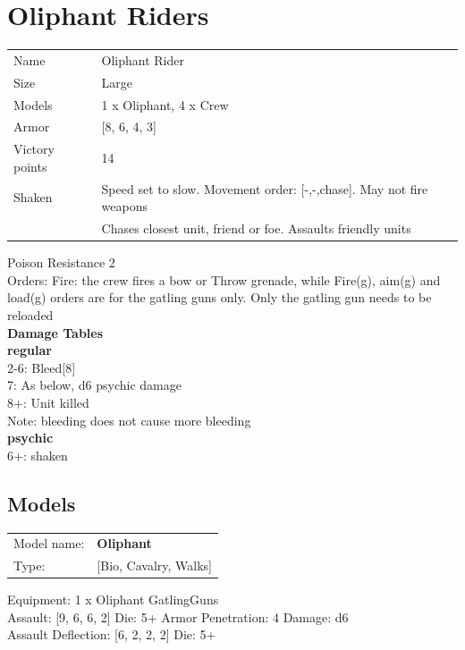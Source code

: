 \clearpage

\section{ Oliphant Riders }

\begin{tabular}{ll}
  Name & Oliphant Rider \\
  Size & Large\\
  Models & 1 x Oliphant, 4 x Crew\\
  Armor & [8, 6, 4, 3]\\
  Victory points & 14\\
  Shaken & Speed set to slow. Movement order: [-,-,chase]. May not fire weapons\\ &Chases closest unit, friend or foe. Assaults friendly units\\
\end{tabular}

Poison Resistance 2\\ 
Orders: Fire: the crew fires a bow or Throw grenade, while Fire(g), aim(g) and load(g) orders are for the gatling guns only. Only the gatling gun needs to be reloaded\\ 



{\bf Damage Tables} \\
 {\bf regular } \\
2-6: Bleed[8]  \\
7: As below, d6 psychic damage \\
8+: Unit killed \\
Note: bleeding does not cause more bleeding \\
 {\bf psychic } \\
6+: shaken \\


\clearpage

\subsection{ Models }

\begin{tabular}{ll}
Model name: & {\bf Oliphant } \\
Type: & [Bio, Cavalry, Walks] \\
\end{tabular}

Equipment: 1 x Oliphant GatlingGuns \\

Assault: [9, 6, 6, 2] Die: 5+ Armor Penetration: 4 Damage: d6 \\
Assault Deflection: [6, 2, 2, 2] Die: 5+\\
\indent  



